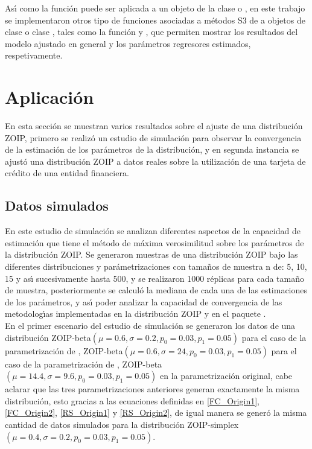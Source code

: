 As\'{\i} como la funci\'{o}n  puede ser aplicada a un objeto de la clase  o , en este trabajo se implementaron otros tipo de funciones asociadas a m\'{e}todos S3 de  a objetos de clase  o clase , tales como la funci\'{o}n  y , que permiten mostrar los resultados del modelo ajustado en general y los par\'{a}metros regresores estimados, respetivamente.


\section{Aplicaci\'{o}n}
En esta secci\'{o}n se muestran varios resultados sobre el ajuste de una distribuci\'{o}n ZOIP, primero se realiz\'{o} un estudio de simulaci\'{o}n para observar la convergencia de la estimaci\'{o}n de los par\'{a}metros de la distribuci\'{o}n, y en segunda instancia se ajust\'{o} una distribuci\'{o}n ZOIP a datos reales sobre la utilizaci\'{o}n de una tarjeta de cr\'{e}dito de una entidad financiera.

\subsection{Datos simulados}
En este estudio de simulaci\'{o}n se analizan diferentes aspectos de la capacidad de estimaci\'{o}n que tiene el m\'{e}todo de m\'{a}xima verosimilitud sobre los par\'{a}metros de la distribuci\'{o}n ZOIP. Se generaron muestras de una distribuci\'{o}n ZOIP bajo las diferentes distribuciones y par\'{a}metrizaciones con tama\~{n}os de muestra n de: 5, 10, 15 y as\'{\i} sucesivamente hasta 500, y se realizaron 1000 r\'{e}plicas para cada tama\~{n}o de muestra, posteriormente se calcul\'{o} la mediana de cada una de las estimaciones de los par\'{a}metros, y as\'{\i} poder analizar la capacidad de convergencia de las metodolog\'{\i}as implementadas en la distribuci\'{o}n ZOIP y en el paquete .\\

En el primer escenario del estudio de simulaci\'{o}n se generaron los datos de una distribuci\'{o}n ZOIP-beta$(\mu=0.6 ,\sigma=0.2 , p_0=0.03 , p_1= 0.05)$ para el caso de la parametrizaci\'{o}n de \cite{Stasinopoulos2}, ZOIP-beta$(\mu=0.6 , \sigma=24 , p_0=0.03 , p_1= 0.05)$ para el caso de la parametrizaci\'{o}n de \cite{Ferrari2}, ZOIP-beta$(\mu=14.4 , \sigma=9.6 , p_0=0.03 , p_1= 0.05)$ en la parametrizaci\'{o}n original, cabe aclarar que las tres parametrizaciones anteriores generan exactamente la misma distribuci\'{o}n, esto gracias a las ecuaciones definidas en \eqref{FC_Origin1}, \eqref{FC_Origin2}, \eqref{RS_Origin1} y \eqref{RS_Origin2}, de igual manera se gener\'{o} la misma cantidad de datos simulados para la distribuci\'{o}n ZOIP-simplex$(\mu=0.4 , \sigma=0.2 , p_0=0.03 , p_1= 0.05)$.\\


